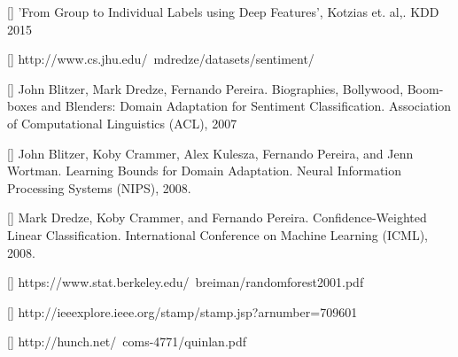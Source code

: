 \documentclass{article} %
\begin{document}
[] 'From Group to Individual Labels using Deep Features', Kotzias et. al,. KDD 2015

[] http://www.cs.jhu.edu/~mdredze/datasets/sentiment/

[] John Blitzer, Mark Dredze, Fernando Pereira. Biographies, Bollywood, Boom-boxes and Blenders: Domain Adaptation for Sentiment Classification. Association of Computational Linguistics (ACL), 2007

[] John Blitzer, Koby Crammer, Alex Kulesza, Fernando Pereira, and Jenn Wortman. Learning Bounds for Domain Adaptation. Neural Information Processing Systems (NIPS), 2008.

[] Mark Dredze, Koby Crammer, and Fernando Pereira. Confidence-Weighted Linear Classification. International Conference on Machine Learning (ICML), 2008.

[] https://www.stat.berkeley.edu/~breiman/randomforest2001.pdf

[] http://ieeexplore.ieee.org/stamp/stamp.jsp?arnumber=709601

[] http://hunch.net/~coms-4771/quinlan.pdf



\end{document}

